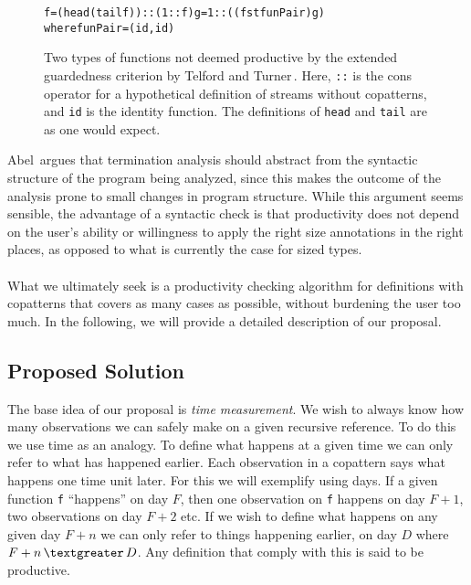 \begin{figure}
\begin{alltt}
f = (head (tail f)) :: (1 :: f)                 g = 1 :: ((fst funPair) g)
                                                where funPair = (id, id)
\end{alltt}
\caption{Two types of functions not deemed productive by the extended guardedness criterion by Telford and Turner\,\citep[Section 6.3]{Telford98ensuringthe}. Here, \texttt{::} is the cons operator for a hypothetical definition of streams without copatterns, and \texttt{id} is the identity function. The definitions of \texttt{head} and \texttt{tail} are as one would expect.} 
\label{fig:TelfordTurnerProblems}
\end{figure}

Abel\,\citep{Abel99terminationchecking} argues that termination analysis should abstract from the syntactic structure of the program being analyzed, since this makes the outcome of the analysis prone to small changes in program structure. While this argument seems sensible, the advantage of a syntactic check is that productivity does not depend on the user's ability or willingness to apply the right size annotations in the right places, as opposed to what is currently the case for sized types.

\paragraph{}
What we ultimately seek is a productivity checking algorithm for definitions with copatterns that covers as many cases as possible, without burdening the user too much. In the following, we will provide a detailed description of our proposal.
\subsection{Proposed Solution}
The base idea of our proposal is \textit{time measurement}. We wish to always know how many observations we can safely make on a given recursive reference. To do this we use time as an analogy. To define what happens at a given time we can only refer to what has happened earlier. Each observation in a copattern says what happens one time unit later. For this we will exemplify using days. If a given function \texttt{f} ``happens'' on day $F$, then one observation on \texttt{f} happens on day $F+1$, two observations on day $F+2$ etc. If we wish to define what happens on any given day $F+n$ we can only refer to things happening earlier, on day $D$ where $F+n\, \textgreater \,D$. Any definition that comply with this is said to be productive.

